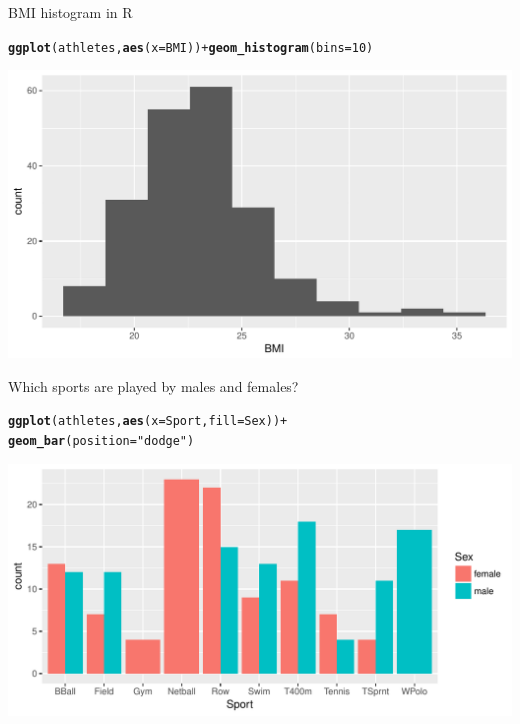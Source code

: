 \documentclass[unknownkeysallowed]{beamer}\usepackage[]{graphicx}\usepackage[]{color}
\makeatletter
\def\maxwidth{ %
  \ifdim\Gin@nat@width>\linewidth
    \linewidth
  \else
    \Gin@nat@width
  \fi
}
\newcommand{\hlnum}[1]{\textcolor[rgb]{0.686,0.059,0.569}{#1}}%
\newcommand{\hlstr}[1]{\textcolor[rgb]{0.192,0.494,0.8}{#1}}%
\newcommand{\hlopt}[1]{\textcolor[rgb]{0,0,0}{#1}}%
\newcommand{\hlstd}[1]{\textcolor[rgb]{0.345,0.345,0.345}{#1}}%
\newcommand{\hlkwc}[1]{\textcolor[rgb]{0.333,0.667,0.333}{#1}}%
\newcommand{\hlkwd}[1]{\textcolor[rgb]{0.737,0.353,0.396}{\textbf{#1}}}%
\newenvironment{kframe}{%
 \def\at@end@of@kframe{}%
 \ifinner\ifhmode%
  \def\at@end@of@kframe{\end{minipage}}%
  \begin{minipage}{\columnwidth}%
 \fi\fi%
 \def\FrameCommand##1{\hskip\@totalleftmargin \hskip-\fboxsep
 \colorbox{shadecolor}{##1}\hskip-\fboxsep
     \hskip-\linewidth \hskip-\@totalleftmargin \hskip\columnwidth}%
 \MakeFramed {\advance\hsize-\width
   \@totalleftmargin\z@ \linewidth\hsize
   \@setminipage}}%
 {\par\unskip\endMakeFramed%
 \at@end@of@kframe}
\newenvironment{knitrout}{}{} %
\makeatother
\begin{document}
\begin{frame}[fragile]{BMI histogram in R}
  
\begin{knitrout}
\color{fgcolor}\begin{kframe}
\begin{alltt}
\hlkwd{ggplot}\hlstd{(athletes,}\hlkwd{aes}\hlstd{(}\hlkwc{x}\hlstd{=BMI))}\hlopt{+}\hlkwd{geom_histogram}\hlstd{(}\hlkwc{bins}\hlstd{=}\hlnum{10}\hlstd{)}
\end{alltt}
\end{kframe}
\includegraphics[width=\maxwidth]{figure/unnamed-chunk-25-1} 

\end{knitrout}
  
\end{frame}

\begin{frame}[fragile]{Which sports are played by males and females?}
  

  
\begin{knitrout}
\color{fgcolor}\begin{kframe}
\begin{alltt}
\hlkwd{ggplot}\hlstd{(athletes,}\hlkwd{aes}\hlstd{(}\hlkwc{x}\hlstd{=Sport,}\hlkwc{fill}\hlstd{=Sex))}\hlopt{+}
  \hlkwd{geom_bar}\hlstd{(}\hlkwc{position}\hlstd{=}\hlstr{"dodge"}\hlstd{)}
\end{alltt}
\end{kframe}
\includegraphics[width=\maxwidth]{figure/unnamed-chunk-26-1} 

\end{knitrout}
  
\end{frame}
\end{document}
